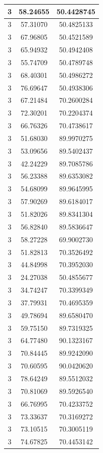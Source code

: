 \documentclass[
]{book}
\begin{document}
\begin{tabular}{c|c|c}
\hline
3 & 58.24655 & 50.4428745\\
\hline
3 & 57.31070 & 50.4825133\\
\hline
3 & 67.96805 & 50.4521589\\
\hline
3 & 65.94932 & 50.4942408\\
\hline
3 & 55.74709 & 50.4789748\\
\hline
3 & 68.40301 & 50.4986272\\
\hline
3 & 76.69647 & 50.4938306\\
\hline
3 & 67.21484 & 70.2600284\\
\hline
3 & 72.30201 & 70.2204374\\
\hline
3 & 66.76326 & 70.4738617\\
\hline
3 & 51.68030 & 89.9970275\\
\hline
3 & 53.09656 & 89.5402437\\
\hline
3 & 42.24229 & 89.7085786\\
\hline
3 & 56.23388 & 89.6353082\\
\hline
3 & 54.68099 & 89.9645995\\
\hline
3 & 57.90269 & 89.6184017\\
\hline
3 & 51.82026 & 89.8341304\\
\hline
3 & 56.82840 & 89.5836647\\
\hline
3 & 58.27228 & 69.9002730\\
\hline
3 & 51.82813 & 70.3526492\\
\hline
3 & 44.84998 & 70.3952030\\
\hline
3 & 24.27038 & 50.4855677\\
\hline
3 & 34.74247 & 70.3399349\\
\hline
3 & 37.79931 & 70.4695359\\
\hline
3 & 49.78694 & 89.6580470\\
\hline
3 & 59.75150 & 89.7319325\\
\hline
3 & 64.77480 & 90.1323167\\
\hline
3 & 70.84445 & 89.9242090\\
\hline
3 & 70.60595 & 90.0420620\\
\hline
3 & 78.64249 & 89.5512032\\
\hline
3 & 70.81069 & 89.5926540\\
\hline
3 & 66.76995 & 70.4233752\\
\hline
3 & 73.33637 & 70.3169272\\
\hline
3 & 73.10515 & 70.3005119\\
\hline
3 & 74.67825 & 70.4453142\\

\end{tabular}
\end{document}
